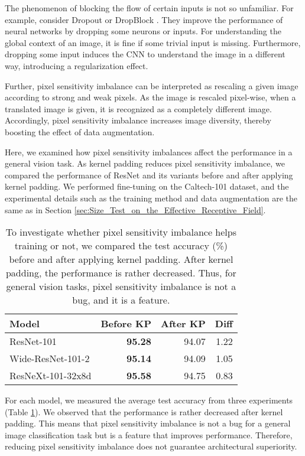 \documentclass[letterpaper]{article} \usepackage{aaai22}  \usepackage{times}  \usepackage{helvet}  \usepackage{courier}  \usepackage[hyphens]{url}  \usepackage{graphicx} \urlstyle{rm} \def\UrlFont{\rm}  \usepackage{natbib}  \usepackage{caption} \DeclareCaptionStyle{ruled}{labelfont=normalfont,labelsep=colon,strut=off} \frenchspacing  \setlength{\pdfpagewidth}{8.5in}  \setlength{\pdfpageheight}{11in}  \usepackage{algorithm}
\begin{document}
The phenomenon of blocking the flow of certain inputs is not so unfamiliar. For example, consider Dropout \cite{srivastava2014dropout} or DropBlock \cite{ghiasi2018dropblock}. They improve the performance of neural networks by dropping some neurons or inputs. For understanding the global context of an image, it is fine if some trivial input is missing. Furthermore, dropping some input induces the CNN to understand the image in a different way, introducing a regularization effect.

Further, pixel sensitivity imbalance can be interpreted as rescaling a given image according to strong and weak pixels. As the image is rescaled pixel-wise, when a translated image is given, it is recognized as a completely different image. Accordingly, pixel sensitivity imbalance increases image diversity, thereby boosting the effect of data augmentation.

Here, we examined how pixel sensitivity imbalances affect the performance in a general vision task. As kernel padding reduces pixel sensitivity imbalance, we compared the performance of ResNet and its variants before and after applying kernel padding. We performed fine-tuning on the Caltech-101 dataset, and the experimental details such as the training method and data augmentation are the same as in Section \ref{sec:Size_Test_on_the_Effective_Receptive_Field}.

\begin{table}[t!]
	\centering
\begin{tabular}{l|r|r|r}
		\toprule
		\textbf{Model}    & \textbf{Before KP} & \textbf{After KP} & \textbf{Diff} \\
\midrule
        ResNet-101        & \textbf{95.28}             & 94.07            &  1.22       \\
		Wide-ResNet-101-2 & \textbf{95.14}             & 94.09            &  1.05       \\
		ResNeXt-101-32x8d & \textbf{95.58}             & 94.75            &  0.83       \\
		\bottomrule
	\end{tabular}
    \caption{To investigate whether pixel sensitivity imbalance helps training or not, we compared the test accuracy (\%) before and after applying kernel padding. After kernel padding, the performance is rather decreased. Thus, for general vision tasks, pixel sensitivity imbalance is not a bug, and it is a feature.}
	\label{tab:general_task}
\end{table}

For each model, we measured the average test accuracy from three experiments (Table \ref{tab:general_task}). We observed that the performance is rather decreased after kernel padding. This means that pixel sensitivity imbalance is not a bug for a general image classification task but is a feature that improves performance. Therefore, reducing pixel sensitivity imbalance does not guarantee architectural superiority.
\end{document}
